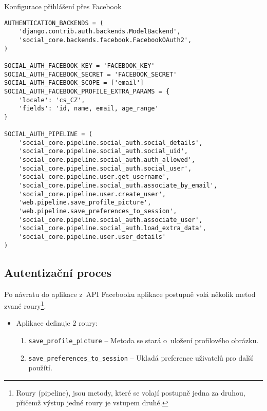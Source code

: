 \begin{listing}[h]
\caption{\label{code:facebook-settings}Konfigurace přihlášení přes Facebook}
\begin{verbatim}
AUTHENTICATION_BACKENDS = (
    'django.contrib.auth.backends.ModelBackend',
    'social_core.backends.facebook.FacebookOAuth2',
)

SOCIAL_AUTH_FACEBOOK_KEY = 'FACEBOOK_KEY'
SOCIAL_AUTH_FACEBOOK_SECRET = 'FACEBOOK_SECRET'
SOCIAL_AUTH_FACEBOOK_SCOPE = ['email']
SOCIAL_AUTH_FACEBOOK_PROFILE_EXTRA_PARAMS = {
    'locale': 'cs_CZ',
    'fields': 'id, name, email, age_range'
}

SOCIAL_AUTH_PIPELINE = (
    'social_core.pipeline.social_auth.social_details',
    'social_core.pipeline.social_auth.social_uid',
    'social_core.pipeline.social_auth.auth_allowed',
    'social_core.pipeline.social_auth.social_user',
    'social_core.pipeline.user.get_username',
    'social_core.pipeline.social_auth.associate_by_email',
    'social_core.pipeline.user.create_user',
    'web.pipeline.save_profile_picture',
    'web.pipeline.save_preferences_to_session',
    'social_core.pipeline.social_auth.associate_user',
    'social_core.pipeline.social_auth.load_extra_data',
    'social_core.pipeline.user.user_details'
)
\end{verbatim}
\end{listing}

\subsection{Autentizační proces}
Po návratu do aplikace z~API Facebooku aplikace postupně volá několik metod zvané roury\footnote{Roury (pipeline), jsou metody, které se volají postupně jedna za druhou, přičemž výstup jedné roury je vstupem druhé.}.
\begin{itemize}
    \item Aplikace definuje 2 roury:
    \begin{enumerate}
        \item \texttt{save\_profile\_picture} -- Metoda se stará o~uložení profilového obrázku.
        \item \texttt{save\_preferences\_to\_session} -- Ukladá preference uživatelů pro další použítí.
    \end{enumerate}
\end{itemize}
